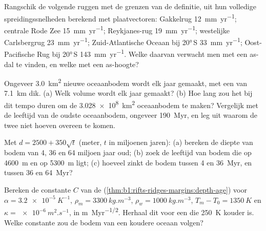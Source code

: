 \begin{exercise}[$\star$]\label{exo:b1:rifts-ridges-margins:3}
Rangschik de volgende ruggen met de grenzen van de definitie, uit hun volledige spreidingssnelheden berekend met plaatvectoren: Gakkelrug \qty{12}{mm.yr^{-1}}; centrale Rode Zee \qty{15}{mm.yr^{-1}}; Reykjanes-rug \qty{19}{mm.yr^{-1}}; westelijke Carlsbergrug \qty{23}{mm.yr^{-1}}; Zuid-Atlantische Oceaan bij \ang{20}\,S \qty{33}{mm.yr^{-1}}; Oost-Pacifische Rug bij \ang{20}\,S \qty{143}{mm.yr^{-1}}. Welke daarvan verwacht men met een as-dal te vinden, en welke met een as-hoogte?
\end{exercise}

\begin{exercise}[$\star$]\label{exo:b1:rifts-ridges-margins:4}
Ongeveer \qty{3.0}{km^2} nieuwe oceaanbodem wordt elk jaar gemaakt, met een  van \qty{7.1}{km} dik. (a) Welk volume  wordt elk jaar gemaakt? (b) Hoe lang zou het bij dit tempo duren om de \qty{3.028e8}{km^2} oceaanbodem te maken? Vergelijk met de leeftijd van de oudste oceaanbodem, ongeveer \qty{190}{Myr}, en leg uit waarom de twee niet hoeven overeen te komen.
\end{exercise}

\begin{exercise}[$\star\star$]\label{exo:b1:rifts-ridges-margins:5}
Met $d = 2500 + 350\sqrt t$ (meter, $t$ in miljoenen jaren): (a) bereken de diepte van bodem van 4, 36 en 64 miljoen jaar oud; (b) zoek de leeftijd van bodem die op \qty{4600}{m} en op \qty{5300}{m} ligt; (c) hoeveel zinkt de bodem tussen 4 en \qty{36}{Myr}, en tussen 36 en \qty{64}{Myr}?
\end{exercise}

\begin{exercise}[$\star\star$]\label{exo:b1:rifts-ridges-margins:6}
Bereken de constante $C$ van de  (\cref{thm:b1:rifts-ridges-margins:depth-age}) voor $\alpha =
\qty{3.2e-5}{K^{-1}}$, $\rho_m = \qty{3300}{kg.m^{-3}}$, $\rho_w =
\qty{1000}{kg.m^{-3}}$, $T_m - T_0 = \qty{1350}{K}$ en $\kappa =
\qty{e-6}{m^2.s^{-1}}$, in \unit{m.Myr^{-1/2}}. Herhaal dit voor een  die \qty{250}{K} kouder is. Welke constante zou de bodem van een koudere oceaan volgen?
\end{exercise}

